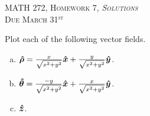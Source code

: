 \documentclass[12pt]{article} %
\newcommand{\thetahat}{\boldsymbol{\hat{\theta}}}
\newcommand{\rhohat}{\boldsymbol{\hat{\rho}}}
\begin{document}
\begin{center}
   \textsc{\large MATH 272, Homework 7, \emph{Solutions}}\\
   \textsc{Due March 31$^\textrm{st}$}
\end{center}
\vspace{.5cm}

\begin{problem}
    Plot each of the following vector fields.
    \begin{enumerate}[(a)]
        \item $\rhohat = \frac{x}{\sqrt{x^2+y^2}}\xhat + \frac{y}{\sqrt{x^2+y^2}}\yhat$.
        \item $\thetahat = \frac{-y}{\sqrt{x^2+y^2}}\xhat + \frac{x}{\sqrt{x^2+y^2}}\yhat$.
        \item $\boldsymbol{\hat{z}}$.
    \end{enumerate}
\end{problem}
\end{document}
